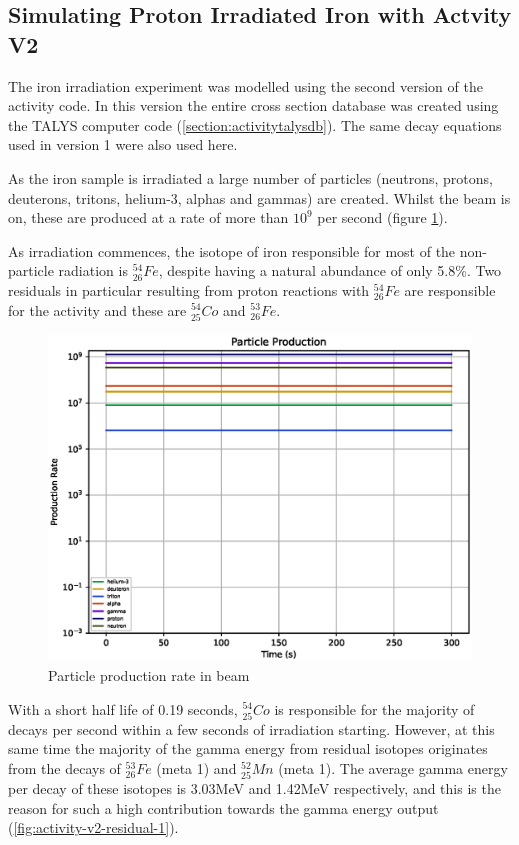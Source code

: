 \subsection{Simulating Proton Irradiated Iron with Actvity V2}

The iron irradiation experiment was modelled using the second version of the activity code.  In this version the entire cross section database was created using the TALYS computer code (\ref{section:activitytalysdb}).  The same decay equations used in version 1 were also used here.

As the iron sample is irradiated a large number of particles (neutrons, protons, deuterons, tritons, helium-3, alphas and gammas) are created.  Whilst the beam is on, these are produced at a rate of more than $10^9$ per second (figure \ref{fig:activity-v2-particle-production}).

As irradiation commences, the isotope of iron responsible for most of the non-particle radiation is ${}^{54}_{26} Fe$, despite having a natural abundance of only 5.8\%.  Two residuals in particular resulting from proton reactions with ${}^{54}_{26} Fe$ are responsible for the activity and these are ${}^{54}_{25}Co$ and ${}^{53}_{26}Fe$.  

\begin{figure}[htb]
\centering
\includegraphics[width=0.5\linewidth]{chapters/activity_code/fe-activity-v2/particle_production_in_beam.eps}
\caption{Particle production rate in beam}
\label{fig:activity-v2-particle-production}
\end{figure}

With a short half life of 0.19 seconds, ${}^{54}_{25}Co$ is responsible for the majority of decays per second within a few seconds of irradiation starting.  However, at this same time the majority of the gamma energy from residual isotopes originates from the decays of ${}^{53}_{26}Fe$ (meta 1) and  ${}^{52}_{25}Mn$ (meta 1).  The average gamma energy per decay of these isotopes is 3.03MeV and 1.42MeV respectively, and this is the reason for such a high contribution towards the gamma energy output (\ref{fig:activity-v2-residual-1}).

